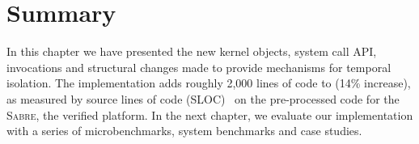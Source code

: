 \section{Summary}

In this chapter we have presented the new kernel objects, system call API, invocations and 
structural changes made to provide mechanisms for temporal isolation. 
The implementation adds roughly 2,000 lines of code to \selfour (14\% increase), as measured
by source lines of code (SLOC)~\citep{Wheeler_01} on the pre-processed code for the \textsc{Sabre}, the verified platform.
In the next chapter, we evaluate our implementation with a series of microbenchmarks, 
system benchmarks and case studies.


